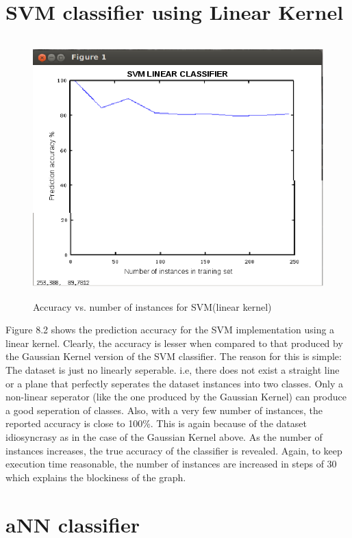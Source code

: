 \documentclass[11pt,a4paper]{report}
\begin{document}
{\section{SVM classifier using Linear Kernel}     

\begin{figure}[H]
\begin{center}
\includegraphics[width=13cm, height=10cm]{svml.png}
\captionsetup{width=13cm}
\caption{Accuracy vs. number of instances for SVM(linear kernel)}
\end{center}
\end{figure}

Figure 8.2 shows the prediction accuracy for the SVM implementation using a linear kernel. Clearly, the accuracy is lesser when compared to that produced by the Gaussian Kernel version of the SVM classifier. The reason for this is simple: The dataset is just no linearly seperable. i.e, there does not exist a straight line or a plane that perfectly seperates the dataset instances into two classes. Only a non-linear seperator (like the one produced by the Gaussian Kernel) can produce a good seperation of classes. Also, with a very few number of instances, the reported accuracy is close to 100\%. This is again because of the dataset idiosyncrasy as in the case of the Gaussian Kernel above. As the number of instances increases, the true accuracy of the classifier is revealed. Again, to keep execution time reasonable, the number of instances are increased in steps of 30 which explains the blockiness of the graph.\\

\section{aNN classifier}   

}
\end{document}
